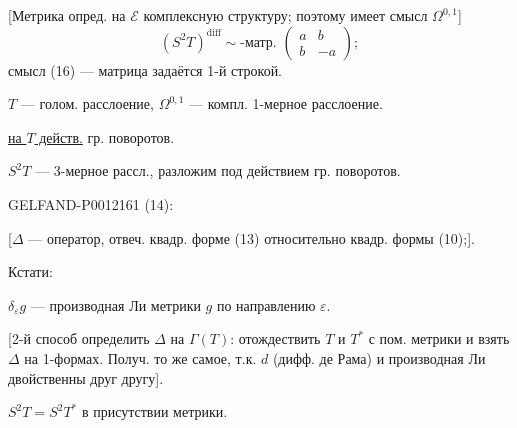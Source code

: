 [Метрика опред. на \(\mathcal E\) комплексную структуру; поэтому имеет смысл \(\Omega^{0,1}\)]
\[
(S^2T)^{\mathrm{diff}}\sim\text{-матр. }\begin{pmatrix}a&b\\b&-a\end{pmatrix};
\]
смысл (16) --- матрица задаётся 1-й строкой.

\(T\) --- голом. расслоение, \(\Omega^{0,1}\) --- компл. 1-мерное расслоение.

\underline{на \(T\) действ.} гр. поворотов.

\(S^2T\) --- 3-мерное рассл., разложим под действием гр. поворотов.


\begin{GelfandAdjacentEvidence}{GELFAND-P001216}{1}
 (14):

[\(\Delta\) --- оператор, отвеч. квадр. форме (13) относительно квадр. формы (10);].

Кстати:

\(\delta_\varepsilon g\) --- производная Ли метрики \(g\) по направлению \(\varepsilon\).

[2-й способ определить \(\Delta\) на \(\Gamma(T)\): отождествить \(T\) и \(T^*\)
с пом. метрики и взять \(\Delta\) на 1-формах.
Получ. то же самое, т.к. \(d\) (дифф. де Рама) и производная Ли двойственны друг другу].
\end{GelfandAdjacentEvidence}


\(S^2T=S^2T^*\) в присутствии метрики.


